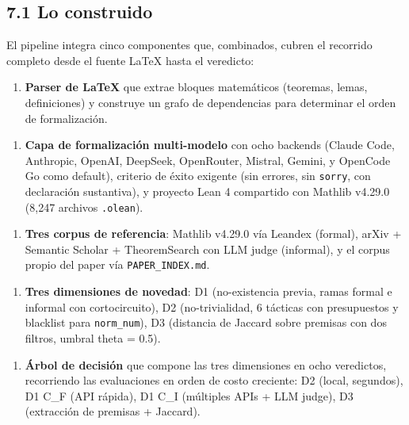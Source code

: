 \documentclass[12pt,a4paper]{article}
\theoremstyle{remark}
\begin{document}
\subsection{7.1 Lo construido}

El pipeline integra cinco componentes que, combinados, cubren el recorrido completo desde el fuente LaTeX hasta el veredicto:

\begin{enumerate}
\item \textbf{Parser de LaTeX} que extrae bloques matemáticos (teoremas, lemas, definiciones) y construye un grafo de dependencias para determinar el orden de formalización.
\end{enumerate}

\begin{enumerate}
\item \textbf{Capa de formalización multi-modelo} con ocho backends (Claude Code, Anthropic, OpenAI, DeepSeek, OpenRouter, Mistral, Gemini, y OpenCode Go como default), criterio de éxito exigente (sin errores, sin \texttt{sorry}, con declaración sustantiva), y proyecto Lean 4 compartido con Mathlib v4.29.0 (8,247 archivos \texttt{.olean}).
\end{enumerate}

\begin{enumerate}
\item \textbf{Tres corpus de referencia}: Mathlib v4.29.0 vía Leandex (formal), arXiv + Semantic Scholar + TheoremSearch con LLM judge (informal), y el corpus propio del paper vía \texttt{PAPER\_INDEX.md}.
\end{enumerate}

\begin{enumerate}
\item \textbf{Tres dimensiones de novedad}: D1 (no-existencia previa, ramas formal e informal con cortocircuito), D2 (no-trivialidad, 6 tácticas con presupuestos y blacklist para \texttt{norm\_num}), D3 (distancia de Jaccard sobre premisas con dos filtros, umbral theta = 0.5).
\end{enumerate}

\begin{enumerate}
\item \textbf{Árbol de decisión} que compone las tres dimensiones en ocho veredictos, recorriendo las evaluaciones en orden de costo creciente: D2 (local, segundos), D1 C\_F (API rápida), D1 C\_I (múltiples APIs + LLM judge), D3 (extracción de premisas + Jaccard).
\end{enumerate}
\end{document}
